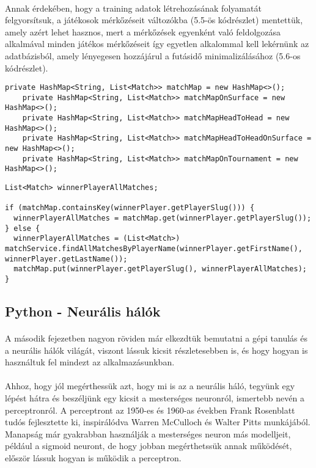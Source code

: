 \paragraph{}
Annak érdekében, hogy a training adatok létrehozásának folyamatát felgyorsítsuk, a játékosok mérkőzéseit változókba (5.5-ös kódrészlet) mentettük, amely azért lehet hasznos, mert a mérkőzések egyenként való feldolgozása alkalmával minden játékos mérkőzéseit így egyetlen alkalommal kell lekérnünk az adatbázisból, amely lényegesen hozzájárul a futásidő minimalizálásához (5.6-os kódrészlet).

\begin{lstlisting}[caption=A futásidő minimalizálásához használt HashMap-ek listája]
    private HashMap<String, List<Match>> matchMap = new HashMap<>();
    private HashMap<String, List<Match>> matchMapOnSurface = new HashMap<>();
    private HashMap<String, List<Match>> matchMapHeadToHead = new HashMap<>();
    private HashMap<String, List<Match>> matchMapHeadToHeadOnSurface = new HashMap<>();
    private HashMap<String, List<Match>> matchMapOnTournament = new HashMap<>();
\end{lstlisting}

\begin{lstlisting}[caption=A győztes játékos meccseinek inicializálása]
List<Match> winnerPlayerAllMatches;

if (matchMap.containsKey(winnerPlayer.getPlayerSlug())) {
  winnerPlayerAllMatches = matchMap.get(winnerPlayer.getPlayerSlug());
} else {
  winnerPlayerAllMatches = (List<Match>) matchService.findAllMatchesByPlayerName(winnerPlayer.getFirstName(), winnerPlayer.getLastName());
  matchMap.put(winnerPlayer.getPlayerSlug(), winnerPlayerAllMatches);
}
\end{lstlisting}

\subsection{Python - Neurális hálók}
\paragraph{}
A második fejezetben nagyon röviden már elkezdtük bemutatni a gépi tanulás és a neurális hálók világát, viszont lássuk kicsit részletesebben is, és hogy hogyan is használtuk fel mindezt az alkalmazásunkban.

\paragraph{}
Ahhoz, hogy jól megérthessük azt, hogy mi is az a neurális háló, tegyünk egy lépést hátra és beszéljünk egy kicsit a mesterséges neuronról, ismertebb nevén a perceptronról. A perceptront az 1950-es és 1960-as években Frank Rosenblatt tudós fejlesztette ki, inspirálódva Warren McCulloch és Walter Pitts munkájából. Manapság már gyakrabban használják a mesterséges neuron más modelljeit, például a sigmoid neuront, de hogy jobban megérthetssük annak működését, először lássuk hogyan is működik a perceptron.

